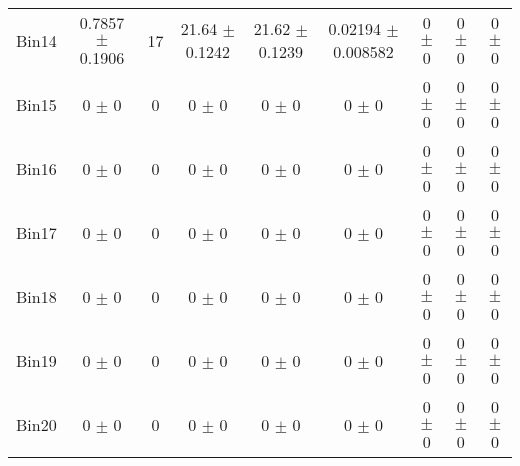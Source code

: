 \begin{tabular}{@{\extracolsep{4pt}}lcccccccc@{}}
     Bin14 & 0.7857 $\pm$ 0.1906 & 17 & 21.64 $\pm$ 0.1242 & 21.62 $\pm$ 0.1239 & 0.02194 $\pm$ 0.008582 & 0 $\pm$ 0 & 0 $\pm$ 0 & 0 $\pm$ 0 \\ 
     Bin15 & 0 $\pm$ 0 & 0 & 0 $\pm$ 0 & 0 $\pm$ 0 & 0 $\pm$ 0 & 0 $\pm$ 0 & 0 $\pm$ 0 & 0 $\pm$ 0 \\ 
     Bin16 & 0 $\pm$ 0 & 0 & 0 $\pm$ 0 & 0 $\pm$ 0 & 0 $\pm$ 0 & 0 $\pm$ 0 & 0 $\pm$ 0 & 0 $\pm$ 0 \\ 
     Bin17 & 0 $\pm$ 0 & 0 & 0 $\pm$ 0 & 0 $\pm$ 0 & 0 $\pm$ 0 & 0 $\pm$ 0 & 0 $\pm$ 0 & 0 $\pm$ 0 \\ 
     Bin18 & 0 $\pm$ 0 & 0 & 0 $\pm$ 0 & 0 $\pm$ 0 & 0 $\pm$ 0 & 0 $\pm$ 0 & 0 $\pm$ 0 & 0 $\pm$ 0 \\ 
     Bin19 & 0 $\pm$ 0 & 0 & 0 $\pm$ 0 & 0 $\pm$ 0 & 0 $\pm$ 0 & 0 $\pm$ 0 & 0 $\pm$ 0 & 0 $\pm$ 0 \\ 
     Bin20 & 0 $\pm$ 0 & 0 & 0 $\pm$ 0 & 0 $\pm$ 0 & 0 $\pm$ 0 & 0 $\pm$ 0 & 0 $\pm$ 0 & 0 $\pm$ 0 \\ 
\hline\hline
  \end{tabular}
